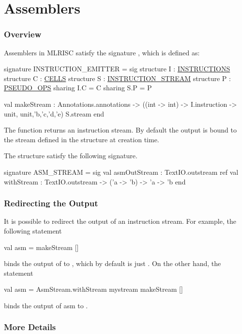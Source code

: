 \section{Assemblers}

\subsubsection{Overview}
Assemblers in MLRISC satisfy the signature 
,
which is defined as:
\begin{SML}
signature INSTRUCTION_EMITTER =
sig
   structure I : \href{instructions.html}{INSTRUCTIONS}
   structure C : \href{cells.html}{CELLS}
   structure S : \href{streams.html}{INSTRUCTION_STREAM}
   structure P : \href{pseudo-ops.html}{PSEUDO_OPS}
      sharing I.C = C
      sharing S.P = P

   val makeStream : Annotations.annotations ->
                     ((int -> int) -> I.instruction -> unit,
                      unit,'b,'c,'d,'e) S.stream
end
\end{SML}

The function  returns an instruction stream.
By default the output is bound to the stream  
defined in the structure 
 at creation time.

The structure  satisfy the following signature.
\begin{SML}
signature ASM_STREAM = sig
  val asmOutStream : TextIO.outstream ref
  val withStream : TextIO.outstream -> ('a -> 'b) -> 'a -> 'b
end
\end{SML}
\subsubsection{Redirecting the Output}
It is possible to redirect the output of an instruction stream.
For example, the following statement
\begin{SML}
   val asm = makeStream []
\end{SML}
binds the output of  to , which
by default is just .  On the other hand, the
statement
\begin{SML}
   val asm = AsmStream.withStream mystream makeStream []
\end{SML}
binds the output of asm to .

\subsubsection{More Details}

